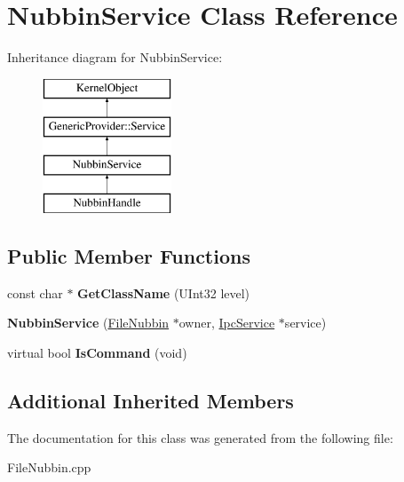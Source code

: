 \hypertarget{class_nubbin_service}{}\section{Nubbin\+Service Class Reference}
\label{class_nubbin_service}
Inheritance diagram for Nubbin\+Service\+:\begin{figure}[H]
\begin{center}
\leavevmode
\includegraphics[height=4.000000cm]{class_nubbin_service}
\end{center}
\end{figure}
\subsection*{Public Member Functions}
\begin{DoxyCompactItemize}
\item 
\mbox{\label{class_nubbin_service_a59958edad8e16b51e936886d1f2574b6}} 
const char $\ast$ {\bfseries Get\+Class\+Name} (U\+Int32 level)
\item 
\mbox{\label{class_nubbin_service_a4abc62615e85b0e2f2185fb6c1b53aa0}} 
{\bfseries Nubbin\+Service} (\hyperlink{class_file_nubbin}{File\+Nubbin} $\ast$owner, \hyperlink{class_ipc_service}{Ipc\+Service} $\ast$service)
\item 
\mbox{\label{class_nubbin_service_a8a5f55282c8cdbde73f1c638f7e97cc6}} 
virtual bool {\bfseries Is\+Command} (void)
\end{DoxyCompactItemize}
\subsection*{Additional Inherited Members}


The documentation for this class was generated from the following file\+:\begin{DoxyCompactItemize}
\item 
File\+Nubbin.\+cpp\end{DoxyCompactItemize}
